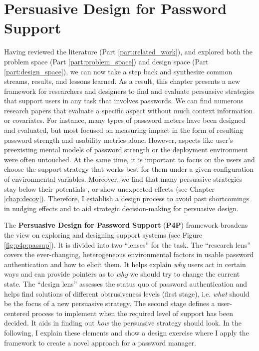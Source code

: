 
\chapter[Persuasive Design for Password Support (P4P)]{Persuasive Design for Password Support}\label{chap:perdespassup}
Having reviewed the literature (Part \ref{part:related_work}), and explored both the problem space (Part \ref{part:problem_space}) and design space (Part \ref{part:design_space}), we can now take a step back and synthesize common streams, results, and lessons learned. 
As a result, this chapter presents a new framework for researchers and designers to find and evaluate persuasive strategies that support users in any task that involves passwords. 
We can find numerous research papers that evaluate a specific aspect without much context information or covariates. For instance, many types of password meters have been designed and evaluated, but most focused on measuring impact in the form of resulting password strength and usability metrics alone. However, aspects like user's preexisting mental models of password strength or the deployment environment were often untouched. At the same time, it is important to focus on the users and choose the support strategy that works best for them under a given configuration of environmental variables. 
Moreover, we find that many persuasive strategies stay below their potentials \cite{Renaud2017LessonsLearnedNudges}, or show unexpected effects (see Chapter \ref{chap:decoy}). Therefore, I establish a design process to avoid past shortcomings in nudging effects and to aid strategic decision-making for persuasive design. 


The \textbf{Persuasive Design for Password Support} (\textbf{P4P}) framework broadens the view on exploring and designing support systems (see Figure \ref{fig:p4p:passup}). It is divided into two ``lenses'' for the task. The ``research lens'' covers the ever-changing, heterogeneous environmental factors in usable password authentication and how to elicit them. It helps explain \textit{why} users act in certain ways and can provide pointers as to \textit{why} we should try to change the current state. The ``design lens'' assesses the status quo of password authentication and helps find solutions of different obtrusiveness levels (first stage), i.e. \textit{what} should be the focus of a new persuasive strategy. The second stage defines a user-centered process to implement when the required level of support has been decided. It aids in finding out \textit{how} the persuasive strategy should look. In the following, I explain these elements and show a design exercise where I apply the framework to create a novel approach for a password manager. 

